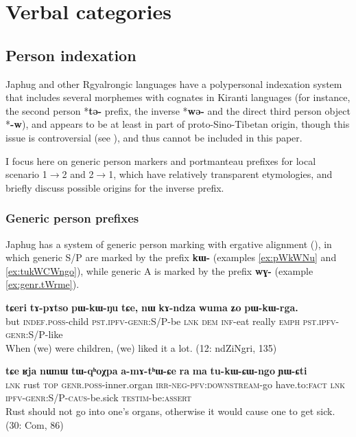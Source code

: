 \documentclass[oldfontcommands,oneside,a4paper,11pt]{article}
\newcommand{\ipa}[1]{\mbox{\phon\textbf{#1}}} %
\begin{document}
  \section{Verbal categories} 

\subsection{Person indexation} 
Japhug and other Rgyalrongic languages have a polypersonal indexation system that includes several morphemes with cognates in Kiranti languages (for instance, the second person *\ipa{tə-} prefix, the inverse *\ipa{wə-} and the direct third person object *\ipa{-w}), and appears to be at least in part of proto-Sino-Tibetan origin, though this issue is controversial (see \citealt{delancey11prefixes, jacques12agreement}), and thus cannot be included in this paper.


I focus here on generic person markers and portmanteau prefixes for local scenario 1$\rightarrow$2 and 2$\rightarrow$1, which have relatively transparent etymologies, and briefly discuss possible origins for the inverse prefix.


\subsubsection{Generic person prefixes}

Japhug has a system of generic person marking with ergative alignment (\citealt{jacques12demotion}), in which generic S/P are marked by the prefix \ipa{kɯ-} (examples \ref{ex:pWkWNu} and \ref{ex:tukWCWngo}), while generic A is marked by the prefix \ipa{wɣ-} (example \ref{ex:genr.tWrme}).


\begin{exe}
\ex \label{ex:pWkWNu}
\gll
\ipa{tɕeri} 	\ipa{tɤ-pɤtso} 	\ipa{pɯ-kɯ-ŋu} 	\ipa{tɕe,} 	\ipa{nɯ} 	\ipa{kɤ-ndza} 	\ipa{wuma} 	\ipa{ʑo} 	\ipa{pɯ-kɯ-rga.} \\
but \textsc{indef.poss}-child \textsc{pst.ipfv-genr}:S/P-be \textsc{lnk} \textsc{dem} \textsc{inf}-eat really \textsc{emph} \textsc{pst.ipfv-genr}:S/P-like \\
\glt When (we) were children, (we) liked it a lot. (12: ndZiNgri, 135)
\end{exe}


\begin{exe}
\ex \label{ex:tukWCWngo}
\gll  \ipa{tɕe} 	\ipa{ʁja} 	\ipa{nɯnɯ} 	\ipa{tɯ-qʰoχpa} 	\ipa{a-mɤ-tʰɯ-ɕe} 	\ipa{ra} 	\ipa{ma} 	\ipa{tu-kɯ-ɕɯ-ngo} 	\ipa{ɲɯ-ɕti} \\
\textsc{lnk} rust \textsc{top} \textsc{genr.poss}-inner.organ \textsc{irr-neg-pfv:downstream}-go have.to:\textsc{fact} \textsc{lnk} \textsc{ipfv-genr:S/P-caus}-be.sick  \textsc{testim}-be:\textsc{assert} \\
\glt Rust should not go into one's organs, otherwise it would cause one to get sick. (30: Com, 86)
\end{exe}
\end{document}
